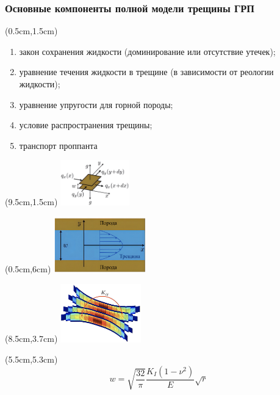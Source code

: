\documentclass{beamer}
\begin{document}
\begin{frame}
\frametitle{Основные компоненты полной модели трещины ГРП}

\begin{textblock*}{8.8cm}(0.5cm,1.5cm)
\begin{enumerate}[1)]
	\item закон сохранения жидкости (доминирование или отсутствие утечек);
	\item уравнение течения жидкости в трещине (в зависимости от реологии жидкости);
	\item уравнение упругости для горной породы;
	\item условие распространения трещины;
	\item транспорт проппанта
\end{enumerate}
\end{textblock*}

\begin{textblock*}{3cm}(9.5cm,1.5cm)
\includegraphics[width=3cm]{part1_balance.jpg}
\end{textblock*}

\begin{textblock*}{4cm}(0.5cm,6cm)
\includegraphics[width=4cm]{part2_flux.jpg}
\end{textblock*}

\begin{textblock*}{3.5cm}(8.5cm,3.7cm)
\includegraphics[width=3.5cm]{part3_elasticity.jpg}
\end{textblock*}


\begin{textblock*}{3cm}(5.5cm,5.3cm)
\tiny
$$
w=\sqrt{\frac{32}{\pi}}\frac{K_{I}\left(1-\nu^2\right)}{E}\sqrt{r}
$$
\normalsize
\end{textblock*}


\end{frame}
\end{document}
